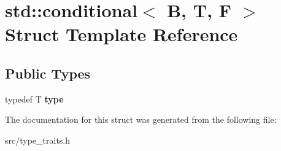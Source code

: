 \hypertarget{structstd_1_1conditional}{}\section{std\+:\+:conditional$<$ B, T, F $>$ Struct Template Reference}
\label{structstd_1_1conditional}
\subsection*{Public Types}
\begin{DoxyCompactItemize}
\item 
typedef T {\bfseries type}\hypertarget{structstd_1_1conditional_afa082101adbc68eaea9c49e34fa8ebfa}{}\label{structstd_1_1conditional_afa082101adbc68eaea9c49e34fa8ebfa}

\end{DoxyCompactItemize}


The documentation for this struct was generated from the following file\+:\begin{DoxyCompactItemize}
\item 
src/type\+\_\+traits.\+h\end{DoxyCompactItemize}
